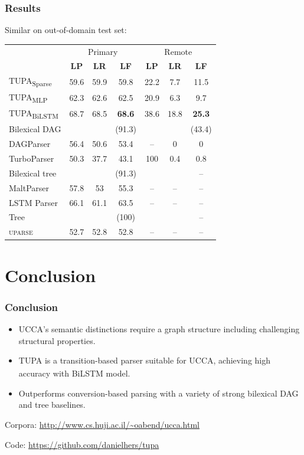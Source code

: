 \documentclass[t]{beamer}
\newcommand{\parser}[1]{TUPA\textsubscript{#1}}
\begin{document}
\begin{frame}
\frametitle{Results}
Similar on out-of-domain test set:
\begin{center}
	\begin{tabular}{l|ccc|ccc}
		& \multicolumn{3}{c|}{Primary} & \multicolumn{3}{c}{Remote} \\
		& \textbf{LP} & \textbf{LR} & \textbf{LF} & \textbf{LP} & \textbf{LR} & \textbf{LF} \\
		\hline
		\parser{Sparse}
		& 59.6 & 59.9 & 59.8 & 22.2 & 7.7 & 11.5 \\
		\parser{MLP}
		& 62.3 & 62.6 & 62.5 & 20.9 & 6.3 & 9.7 \\
		\parser{BiLSTM}
		& 68.7 & 68.5 & \textbf{68.6} & 38.6 & 18.8 & \textbf{25.3} \\
		\hline
		\footnotesize Bilexical DAG
		& & & \footnotesize (91.3) & & & \footnotesize (43.4) \\
		DAGParser
		& 56.4 & 50.6 & 53.4 & -- & 0 & 0 \\
		TurboParser
		& 50.3 & 37.7 & 43.1 & 100 & 0.4 & 0.8 \\
		\hline
		\footnotesize Bilexical tree
		& & & \footnotesize (91.3) & & & \footnotesize -- \\
		MaltParser
		& 57.8 & 53 & 55.3 & -- & -- & -- \\
		LSTM Parser
		& 66.1 & 61.1 & 63.5 & -- & -- & -- \\
		\hline
		\footnotesize Tree
		& & & \footnotesize (100) & & & \footnotesize -- \\
		\textsc{uparse}
		& 52.7 & 52.8 & 52.8 & -- & -- & --
	\end{tabular}
\end{center}
\end{frame}



\section{Conclusion}

\begin{frame}
\frametitle{Conclusion}
\begin{itemize}
 \item UCCA's semantic distinctions require a graph structure including challenging structural properties.
 \item \parser{} is a transition-based parser suitable for UCCA, achieving high accuracy with BiLSTM model.
 \item Outperforms conversion-based parsing with a variety of strong bilexical DAG and tree baselines.
\end{itemize}

\vfill
Corpora: \url{http://www.cs.huji.ac.il/~oabend/ucca.html}

Code: \url{https://github.com/danielhers/tupa}
\end{frame}
\end{document}
